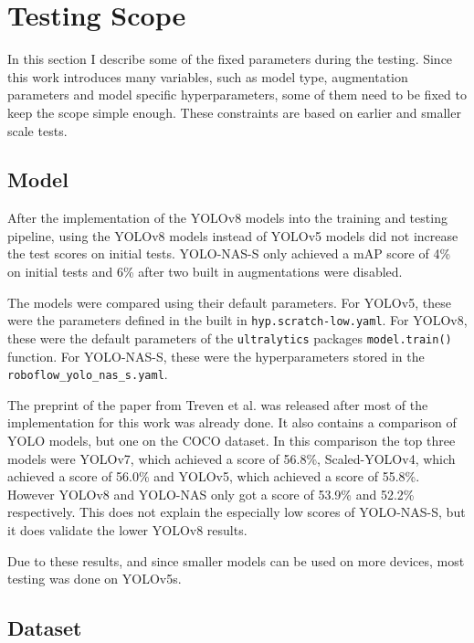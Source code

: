 \documentclass[10pt]{book}
\begin{document}
\section{Testing Scope}

In this section I describe some of the fixed parameters during the testing. Since this work introduces many variables, such as model type, augmentation parameters and model specific hyperparameters, some of them need to be fixed to keep the scope simple enough. These constraints are based on earlier and smaller scale tests.


\subsection{Model}

After the implementation of the \ac{YOLO}v8 models into the training and testing pipeline, using the \ac{YOLO}v8 models instead of \ac{YOLO}v5 models did not increase the test scores on initial tests. \ac{YOLO}-NAS-S only achieved a \ac{mAP} score of 4\% on initial tests and 6\% after two built in augmentations were disabled.

The models were compared using their default parameters. For \ac{YOLO}v5, these were the parameters defined in the built in \texttt{hyp.scratch-low.yaml}. For \ac{YOLO}v8, these were the default parameters of the \texttt{ultralytics} packages \texttt{model.train()} function. For \ac{YOLO}-NAS-S, these were the hyperparameters stored in the \texttt{roboflow\_yolo\_nas\_s.yaml}.

The preprint of the paper from Treven et al. \cite{terven2023comprehensive} was released after most of the implementation for this work was already done. It also contains a comparison of \ac{YOLO} models, but one on the \ac{COCO} dataset. In this comparison the top three models were \ac{YOLO}v7, which achieved a score of 56.8\%, Scaled-\ac{YOLO}v4, which achieved a score of 56.0\% and \ac{YOLO}v5, which achieved a score of 55.8\%. However \ac{YOLO}v8 and \ac{YOLO}-NAS only got a score of 53.9\% and 52.2\% respectively. This does not explain the especially low scores of \ac{YOLO}-NAS-S, but it does validate the lower \ac{YOLO}v8 results.

Due to these results, and since smaller models can be used on more devices, most testing was done on \ac{YOLO}v5s.

\subsection{Dataset}
\end{document}

